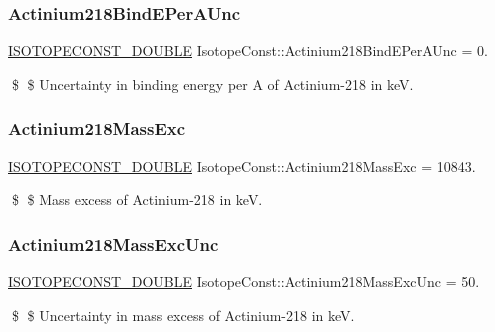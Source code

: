 \subsubsection{\texorpdfstring{Actinium218\+Bind\+E\+Per\+A\+Unc}{Actinium218BindEPerAUnc}}
{\footnotesize\ttfamily \mbox{\hyperlink{group___isotope_const-_macros_ga8f45a7272ce02c0b4c65c44636ed719a}{I\+S\+O\+T\+O\+P\+E\+C\+O\+N\+S\+T\+\_\+\+D\+O\+U\+B\+LE}} Isotope\+Const\+::\+Actinium218\+Bind\+E\+Per\+A\+Unc = 0.}

\$ \$ Uncertainty in binding energy per A of Actinium-\/218 in keV. \mbox{\label{group___isotope_const-_actinium-_ac218_ga9a8242b8b02f1b5e25f50dece44a22cb}} 
\subsubsection{\texorpdfstring{Actinium218\+Mass\+Exc}{Actinium218MassExc}}
{\footnotesize\ttfamily \mbox{\hyperlink{group___isotope_const-_macros_ga8f45a7272ce02c0b4c65c44636ed719a}{I\+S\+O\+T\+O\+P\+E\+C\+O\+N\+S\+T\+\_\+\+D\+O\+U\+B\+LE}} Isotope\+Const\+::\+Actinium218\+Mass\+Exc = 10843.}

\$ \$ Mass excess of Actinium-\/218 in keV. \mbox{\label{group___isotope_const-_actinium-_ac218_gaa62e529c8bf9f1cfbf7fcdf8fe9df350}} 
\subsubsection{\texorpdfstring{Actinium218\+Mass\+Exc\+Unc}{Actinium218MassExcUnc}}
{\footnotesize\ttfamily \mbox{\hyperlink{group___isotope_const-_macros_ga8f45a7272ce02c0b4c65c44636ed719a}{I\+S\+O\+T\+O\+P\+E\+C\+O\+N\+S\+T\+\_\+\+D\+O\+U\+B\+LE}} Isotope\+Const\+::\+Actinium218\+Mass\+Exc\+Unc = 50.}

\$ \$ Uncertainty in mass excess of Actinium-\/218 in keV. \mbox{\label{group___isotope_const-_actinium-_ac218_ga8d9a5c3894c9650814e77bcba70816be}} 
